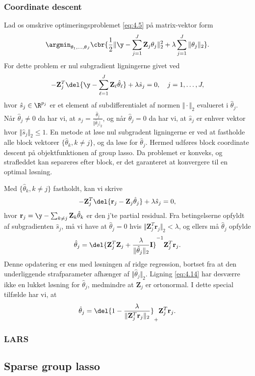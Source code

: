 \subsubsection{Coordinate descent}
Lad os omskrive optimeringsproblemet \eqref{eq:4.5} på matrix-vektor form
\begin{align*}
\argmin_{\theta_1, \ldots, \theta_J} \cbr{\frac{1}{2} \Vert \y - \sum_{j=1}^J \mathbf{Z}_{j} \theta_j \Vert_2^2 + \lambda \sum_{j=1}^J \Vert \theta_j \Vert_2}.
\end{align*}
For dette problem er nul subgradient ligningerne givet ved
\begin{align*}
- \mathbf{Z}_{j}^T \del{\y - \sum_{\ell=1}^J \mathbf{Z}_\ell \hat{\theta}_\ell} + \lambda \hat{s}_j = 0, \quad j=1,\ldots, J,
\end{align*} 
hvor $\hat{s}_j \in \R^{p_j}$ er et element af subdifferentialet af normen $\Vert \cdot \Vert_2$ evalueret i $\hat{\theta}_j$.
Når $\hat{\theta}_j \neq 0$ da har vi, at $\hat{s}_j = \frac{\hat{\theta}_j}{\Vert \hat{\theta}_j \vert_2}$, og når $\hat{\theta}_j=0$ da har vi, at $\hat{s}_j$ er enhver vektor hvor $\Vert \hat{s}_j \Vert_2 \leq 1$.
En metode at løse nul subgradent ligningerne er ved at fastholde alle block vektorer $\{\hat{\theta}_k, k \neq j\}$, og da løse for $\hat{\theta}_j$.
Hermed udføres block coordinate descent på objektfunktionen af group lasso.
Da problemet er konveks, og strafleddet kan separeres efter block, er det garanteret at konvergere til en optimal løsning.

Med $\{\hat{\theta}_k, k \neq j\}$ fastholdt, kan vi skrive
\begin{align*}
- \mathbf{Z}_{j}^T \del{\mathbf{r}_j - \mathbf{Z}_j \hat{\theta}_j} + \lambda \hat{s}_j = 0,
\end{align*}
hvor $\mathbf{r}_j = \y - \sum_{k \neq j} \mathbf{Z}_k \hat{\theta}_k $ er den j'te partial residual.
Fra betingelserne opfyldt af subgradienten $\hat{s}_j$, må vi have at $\hat{\theta}_j =0$ hvis $\Vert \mathbf{Z}_j^T \mathbf{r}_j \Vert_2 < \lambda$, og ellers må $\hat{\theta}_j$ opfylde
\begin{align}
\hat{\theta}_j = \del{\mathbf{Z}_j^T \mathbf{Z}_j + \frac{\lambda}{\Vert \hat{\theta}_j \Vert_2} \mathbf{I}}^{-1} \mathbf{Z}_j^T \mathbf{r}_j. \label{eq:4.14}
\end{align}
Denne opdatering er ens med løsningen af ridge regression, bortset fra at den underliggende strafparameter afhænger af $\Vert \hat{\theta}_j \Vert_2$.
Ligning \eqref{eq:4.14} har desværre ikke en lukket løsning for $\hat{\theta}_j$, medmindre at $\mathbf{Z}_j$ er ortonormal. I dette special tilfælde har vi, at
\begin{align*}
\hat{\theta}_j = \del{1 - \frac{\lambda}{\Vert \mathbf{Z}_j^T \mathbf{r}_j \Vert_2}}_+  \mathbf{Z}_j^T \mathbf{r}_j.
\end{align*}

\subsubsection{LARS}

\subsection{Sparse group lasso}

\newpage